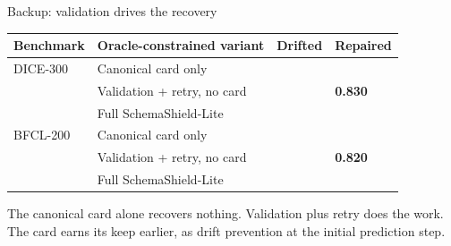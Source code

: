\documentclass[aspectratio=169,11pt]{beamer}
\newcommand{\method}{SchemaShield-Lite\xspace}
\begin{document}
\begin{frame}{Backup: validation drives the recovery}
  \vspace{0.22cm}
  \renewcommand{\arraystretch}{1.24}
  {\fontsize{10}{12.5}\selectfont
  \begin{tabular}{@{}>{\RaggedRight\arraybackslash}p{2.15cm}
                    >{\RaggedRight\arraybackslash}p{5.05cm}
                    >{\centering\arraybackslash}p{1.95cm}
                    >{\centering\arraybackslash}p{1.95cm}@{}}
    \toprule
    Benchmark & Oracle-constrained variant & Drifted & Repaired \\
    \midrule
    DICE-300 & Canonical card only         & 0.770 & 0.770 \\
             & Validation + retry, no card & 0.730 & \textbf{0.830} \\
             & Full \method                & 0.713 & 0.827 \\
    \addlinespace[0.30em]
    BFCL-200 & Canonical card only         & 0.810 & 0.810 \\
             & Validation + retry, no card & 0.645 & \textbf{0.820} \\
             & Full \method                & 0.640 & 0.795 \\
    \bottomrule
  \end{tabular}}\par

  \vspace{0.30cm}
  {\fontsize{10.5}{13.5}\selectfont
    The canonical card alone recovers nothing. Validation plus retry does the work. The card earns its keep earlier, as drift prevention at the initial prediction step.\par}

\end{frame}
\end{document}
